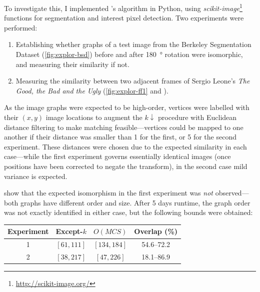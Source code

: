 \documentclass{mpaper}
\begin{document}
To investigate this, I implemented \citeauthor{Plane-Graphs-From-Images}'s algorithm in Python, using \textit{scikit-image}\footnote{\url{http://scikit-image.org/}} functions for segmentation and interest pixel detection.
Two experiments were performed:
\begin{enumerate}
	\item Establishing whether graphs of a test image from the Berkeley Segmentation Dataset \cite{BerkeleyDatabase} (\cref{fig:explor-bsd}) before and after \SI{180}{\degree} rotation were isomorphic, and measuring their similarity if not.
	\item Measuring the similarity between two adjacent frames of Sergio Leone's \emph{The Good, the Bad and the Ugly} (\cref{fig:explor-ff1} and ).
\end{enumerate}
As the image graphs were expected to be high-order, vertices were labelled with their $(x,y)$ image locations to augment the $k\downarrow$ procedure with Euclidean distance filtering to make matching feasible---vertices could be mapped to one another if their distance was smaller than 1 for the first, or 5 for the second experiment.
These distances were chosen due to the expected similarity in each case---while the first experiment governs essentially identical images (once positions have been corrected to negate the transform), in the second case mild variance is expected.

 show that the expected isomorphism in the first experiment was \emph{not} observed---both graphs have different order and size.
After 5 days runtime, the graph order was not exactly identified in either case, but the following bounds were obtained:

\begin{table}[h]
\centering
\begin{tabular}{|c|c|c|c|}
	\hline
	Experiment & Except-$k$ & $O(MCS)$ & Overlap (\si{\percent}) \\ \hline
	1 & $[61, 111]$ & $[134, 184]$ & 54.6--72.2 \\
	2 & $[38, 217]$ & $[47, 226]$ & 18.1--86.9 \\
	\hline
\end{tabular}
\end{table}
\end{document}
